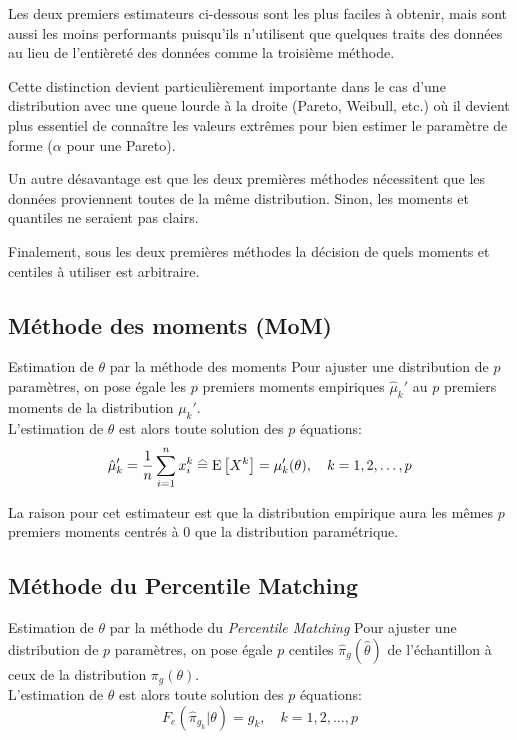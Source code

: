 \documentclass[10pt, french]{article}
\begin{document}
\begin{multicols*}{2}
Les deux premiers estimateurs ci-dessous sont les plus faciles à obtenir, mais sont aussi les moins performants puisqu'ils n'utilisent que quelques traits des données au lieu de l'entièreté des données comme la troisième méthode.

Cette distinction devient particulièrement importante dans le cas d'une distribution avec une queue lourde à la droite (Pareto, Weibull, etc.) où il devient plus essentiel de connaître les valeurs extrêmes pour bien estimer le paramètre de forme ($\alpha$ pour une Pareto).

Un autre désavantage est que les deux premières méthodes nécessitent que les données proviennent toutes de la même distribution. Sinon, les moments et quantiles ne seraient pas clairs.

Finalement, sous les deux premières méthodes la décision de quels moments et centiles à utiliser est arbitraire.

\subsection{Méthode des moments (MoM)}

\begin{algo}{Estimation de $\theta$ par la méthode des moments}
Pour ajuster une distribution de $p$ paramètres, on pose égale les $p$ premiers moments empiriques $\hat\mu_{k}'$ au $p$ premiers moments de la distribution $\mu_{k}'$.\\
L'estimation de $\theta$ est alors toute solution des $p$ équations:
\begin{equation*}
	\hat{\mu}_{k}' 
	=	\frac{1}{n}\sum_{i = 1}^{n} x_{i}^{k}
	\equalhat	\esp{X^{k}}
	=	\mu_{k}'(\theta), \quad	k = 1, 2, \dots, p
\end{equation*}
\end{algo}

La raison pour cet estimateur est que la distribution empirique aura les mêmes $p$ premiers moments centrés à 0 que la distribution paramétrique.

\subsection{Méthode du \guillemotleft Percentile Matching \guillemotright}

\begin{algo}{Estimation de $\theta$ par la méthode du \og \textit{Percentile Matching} \fg{}}
Pour ajuster une distribution de $p$ paramètres, on pose égale $p$ centiles $\hat{\pi}_{g}(\hat{\theta})$ de l'échantillon à ceux de la distribution $\pi_{g}(\theta)$.\\
L'estimation de $\theta$ est alors toute solution des $p$ équations:
\begin{equation*}
	F_{e}(\hat\pi_{g_{k}} | \theta)	=	g_{k}, \quad	k = 1, 2, \dots, p
\end{equation*}
\end{algo}


\end{multicols*}
\end{document}
